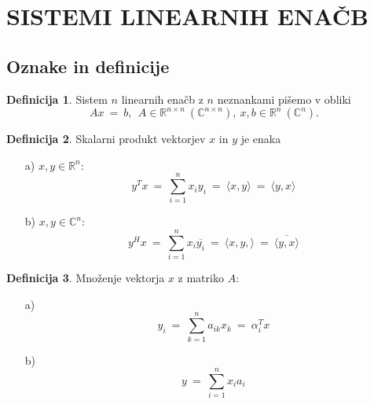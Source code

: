 \documentclass[11pt]{article}
\theoremstyle{definition}
\newtheorem{definicija}{Definicija}[section]
\begin{document}

\pagebreak


\section{SISTEMI LINEARNIH ENAČB}
\vspace{0.5cm}


\subsection{Oznake in definicije}
\vspace{0.5cm}

\begin{definicija}

Sistem $n$ linearnih enačb z $n$ neznankami pišemo v obliki
$$Ax ~=~ b, ~~A \in \mathbb{R}^{n \times n} ~(\mathbb{C}^{n \times n}), ~x, b \in \mathbb{R}^n ~(\mathbb{C}^n).$$

\end{definicija}
\vspace{0.5cm}

\begin{definicija}

Skalarni produkt vektorjev $x$ in $y$ je enaka
\begin{enumerate}
	\item[a)] $x, y \in \mathbb{R}^n$:
	$$y^T x ~=~ \sum_{i=1}^n x_i y_i ~=~ \langle x, y \rangle ~=~ \langle y, x \rangle$$
	\item[b)] $x, y \in \mathbb{C}^n$:
	$$y^H x ~=~ \sum_{i=1}^n x_i \overline{y_i} ~=~ \langle x, y, \rangle ~=~ \overline{\langle y, x \rangle}$$
\end{enumerate}

\end{definicija}
\vspace{0.5cm}

\begin{definicija}

Množenje vektorja $x$ z matriko $A$:
\begin{enumerate}
	\item[a)] $$y_i ~=~ \sum_{k=1}^n a_{ik} x_k ~=~ \alpha_i^T x$$
	\item[b)] $$y ~=~ \sum_{i=1}^n x_i a_i$$
\end{enumerate}

\end{definicija}
\vspace{0.5cm}
\end{document}
